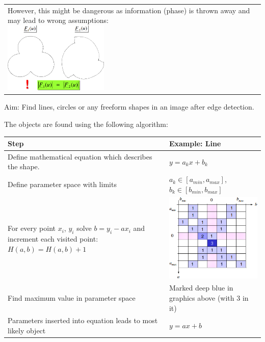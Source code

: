 \begin{tabular}{ll}
{            However, this might be dangerous as information (phase) is thrown away and may lead to wrong assumptions:\\
            \includegraphics[width=5cm]{./images/fourier_descriptiors_danger.png}
            }
    \end{tabular}
      
      
    
      Aim: Find lines, circles or any freeform shapes in an image after edge detection.
      
      The objects are found using the following algorithm:\\
      \begin{tabular}{|l|l|}
        \hline
        \textbf{Step} & \textbf{Example: Line} \\
        \hline
        Define mathematical equation which describes the shape.
          & $y = a_k x + b_k$ \\
        \hline
        Define parameter space with limits
          & $a_k \in [a_{min}, a_{max}]$, $b_k \in [b_{min}, b_{max}]$ \\
        \hline
        \parbox{9cm}{For every point $x_i$, $y_i$ solve $b = y_i-ax_i$ and increment each visited 
          point: $H(a,b)=H(a,b)+1$ }
          & \parbox{9cm}{
            \includegraphics[width=6cm]{./images/hough_transform_parameterspace.png}
            } \\
        \hline
        Find maximum value in parameter space
          & Marked deep blue in graphics above (with 3 in it) \\
        \hline
        Parameters inserted into equation leads to most likely object
          & $y = a x + b$ \\
        \hline
      \end{tabular}
      
